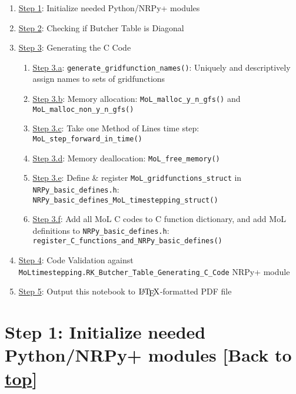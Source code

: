 \documentclass[landscape,letterpaper,10pt,english]{article}
\providecommand{\tightlist}{%
      \setlength{\itemsep}{0pt}\setlength{\parskip}{0pt}}
\let\Oldlatex\LaTeX
\renewcommand{\LaTeX}{\textrm{\Oldlatex}}
\begin{document}
\begin{enumerate}
\def\labelenumi{\arabic{enumi}.}
\tightlist
\item
  \hyperref[initializenrpy]{Step 1}: Initialize needed Python/NRPy+
  modules
\item
  \hyperref[diagonal]{Step 2}: Checking if Butcher Table is Diagonal
\item
  \hyperref[ccode]{Step 3}: Generating the C Code

  \begin{enumerate}
  \def\labelenumii{\arabic{enumii}.}
  \tightlist
  \item
    \hyperref[generategfnames]{Step 3.a}:
    \texttt{generate\_gridfunction\_names()}: Uniquely and descriptively
    assign names to sets of gridfunctions
  \item
    \hyperref[alloc]{Step 3.b}: Memory allocation:
    \texttt{MoL\_malloc\_y\_n\_gfs()} and
    \texttt{MoL\_malloc\_non\_y\_n\_gfs()}
  \item
    \hyperref[molstep]{Step 3.c}: Take one Method of Lines time step:
    \texttt{MoL\_step\_forward\_in\_time()}
  \item
    \hyperref[free]{Step 3.d}: Memory deallocation:
    \texttt{MoL\_free\_memory()}
  \item
    \hyperref[nrpybasicdefines]{Step 3.e}: Define \& register
    \texttt{MoL\_gridfunctions\_struct} in
    \texttt{NRPy\_basic\_defines.h}:
    \texttt{NRPy\_basic\_defines\_MoL\_timestepping\_struct()}
  \item
    \hyperref[setupall]{Step 3.f}: Add all MoL C codes to C function
    dictionary, and add MoL definitions to
    \texttt{NRPy\_basic\_defines.h}:
    \texttt{register\_C\_functions\_and\_NRPy\_basic\_defines()}
  \end{enumerate}
\item
  \hyperref[code_validation]{Step 4}: Code Validation against
  \texttt{MoLtimestepping.RK\_Butcher\_Table\_Generating\_C\_Code} NRPy+
  module
\item
  \hyperref[latex_pdf_output]{Step 5}: Output this notebook to
  \(\LaTeX\)-formatted PDF file
\end{enumerate}

    \hypertarget{step-1-initialize-needed-pythonnrpy-modules-back-to-top}{%
\section{\texorpdfstring{Step 1: Initialize needed Python/NRPy+ modules
{[}Back to
\hyperref[toc]{top}{]}}{Step 1: Initialize needed Python/NRPy+ modules {[}Back to {]}}}\label{step-1-initialize-needed-pythonnrpy-modules-back-to-top}}
\end{document}
